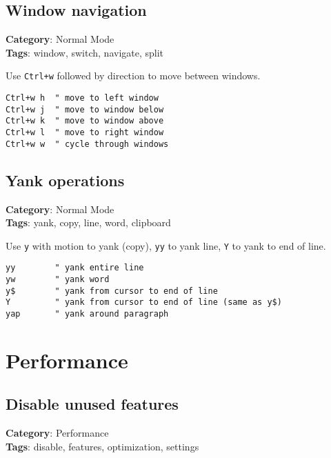 {{{{{{{{{\section{Window navigation}

\textbf{Category}: Normal Mode\\ \textbf{Tags}: window, switch, navigate, split
\vspace{0.5cm}

Use {\footnotesize \Verb§Ctrl+w§} followed by direction to move between windows.

\begin{Exa*}{}
\begin{Verbatim}[fontsize=\footnotesize, breaklines, breakanywhere]
Ctrl+w h  " move to left window
Ctrl+w j  " move to window below
Ctrl+w k  " move to window above
Ctrl+w l  " move to right window
Ctrl+w w  " cycle through windows
\end{Verbatim}
\end{Exa*}

\section{Yank operations}

\textbf{Category}: Normal Mode\\ \textbf{Tags}: yank, copy, line, word, clipboard
\vspace{0.5cm}

Use {\footnotesize \Verb§y§} with motion to yank (copy), {\footnotesize \Verb§yy§} to yank line, {\footnotesize \Verb§Y§} to yank to end of line.

\begin{Exa*}{}
\begin{Verbatim}[fontsize=\footnotesize, breaklines, breakanywhere]
yy        " yank entire line
yw        " yank word
y$        " yank from cursor to end of line
Y         " yank from cursor to end of line (same as y$)
yap       " yank around paragraph
\end{Verbatim}
\end{Exa*}

\chapter{Performance}
\section{Disable unused features}

\textbf{Category}: Performance\\ \textbf{Tags}: disable, features, optimization, settings
\vspace{0.5cm}

}}}}}}}}}
